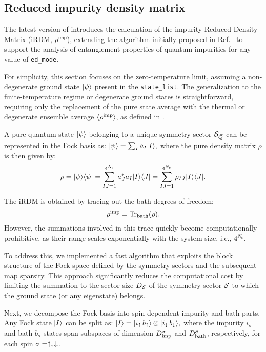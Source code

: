 \documentclass[edipack2.tex]{subfiles}
\begin{document}
\subsection{Reduced impurity density matrix}\label{sSecRDM}
The latest version of \NAME introduces the calculation of the 
impurity Reduced Density Matrix (iRDM, $\rho^\mathrm{imp}$), 
extending the algorithm initially proposed in 
Ref.~ to support the analysis of entanglement 
properties of quantum impurities for any value of  {\tt ed\_mode}.

For simplicity, this section focuses on the zero-temperature limit, 
assuming a non-degenerate ground state $|\psi\rangle$ present in the 
{\tt state\_list}. The generalization to the finite-temperature regime 
or degenerate ground states is straightforward, requiring only the 
replacement of the pure state average with the thermal or degenerate 
ensemble average $\langle \rho^\mathrm{imp} \rangle$, as defined in 
.


A pure quantum state $|\psi\rangle$ belonging to a unique symmetry 
sector ${\cal S}_{\vec{Q}}$ can be represented in the Fock basis as:
$
|\psi\rangle = \sum_I a_I |I\rangle,
$
where the pure density matrix $\rho$ is then given by:
\begin{equation}
\rho = |\psi\rangle\langle \psi| = \sum_{IJ=1}^{4^{N_\mathrm{s}}} 
a^*_J a_I |I\rangle\langle J| = \sum_{IJ=1}^{4^{N_\mathrm{s}}} 
\rho_{IJ} |I\rangle\langle J|.
\end{equation}


The iRDM is obtained by tracing out the bath degrees of freedom:
\begin{equation}
\rho^\mathrm{imp} = {\rm Tr}_\mathrm{bath}(\rho).
\end{equation}
However, the summations involved in this trace quickly become 
computationally prohibitive, as their range scales exponentially 
with the system size, i.e., $4^{N_\mathrm{s}}$.

To address this, we implemented a fast algorithm that exploits the 
block structure of the Fock space defined by the symmetry sectors and
the subsequent map sparsity. 
This approach significantly reduces the computational cost by limiting 
the summation to the sector size $D_{\cal S}$ of the symmetry sector 
${\cal S}$ to which the ground state (or any eigenstate) belongs.


Next, we decompose the Fock basis into spin-dependent impurity and 
bath parts. Any Fock state $|I\rangle$ can be split as:
$
|I\rangle = |i_\uparrow \, b_\uparrow\rangle \otimes 
|i_\downarrow \, b_\downarrow\rangle,
$
where the impurity $i_\sigma$ and bath $b_\sigma$ states span subspaces of dimension 
$D^\sigma_\mathrm{imp}$ and $D^\sigma_\mathrm{bath}$, respectively, for each 
spin $\sigma = \uparrow, \downarrow$.
\end{document}
